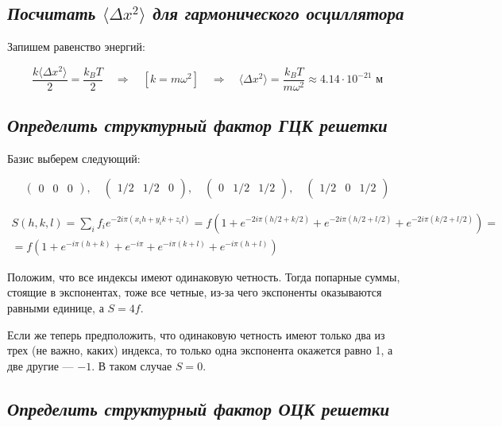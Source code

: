 \documentclass[a4paper, 12pt]{article}
\newcommand{\qrq}
{\ensuremath{\quad \Rightarrow \quad}} %
\begin{document}
\subsection{\textit{Посчитать $\langle \Delta x^2 \rangle$ для гармонического осциллятора}}

Запишем равенство энергий:

\begin{equation}
	\frac{k \langle \Delta x^2 \rangle}{2} = \frac{k_B T}{2} \qrq \left[k = m \omega^2\right] \qrq \langle \Delta x^2 \rangle = \frac{k_B T}{m \omega^2} \approx 4.14 \cdot 10^{-21} \text{ м}
\end{equation}

\subsection{\textit{Определить структурный фактор ГЦК решетки}}

Базис выберем следующий:

\begin{equation}
\begin{pmatrix}
	0 & 0 & 0
\end{pmatrix}, \quad
\begin{pmatrix}
	1/2 & 1/2  & 0
\end{pmatrix}, \quad
\begin{pmatrix}
	0 & 1/2 & 1/2
\end{pmatrix}, \quad
\begin{pmatrix}
	1/2 & 0 & 1/2 
\end{pmatrix}
\end{equation}

\begin{align*}
	S(h, k, l) = \sum\limits_i f_i e^{-2 i \pi (x_i h + y_i k + z_i l)} = f\left(1 + e^{-2 i \pi (h/2 + k/2)} + e^{-2i\pi(h/2 + l/2)} + e^{-2i\pi(k/2 + l/2)}\right) = \\
	= f(1 + e^{-i\pi(h + k)} + e^{-i\pi} + e^{-i\pi(k + l)} + e^{-i\pi(h + l)})
\end{align*}

Положим, что все индексы имеют одинаковую четность. Тогда попарные суммы, стоящие в экспонентах, тоже все четные, из-за чего экспоненты оказываются равными единице, а $S = 4f$.

Если же теперь предположить, что одинаковую четность имеют только два из трех (не важно, каких) индекса, то только одна экспонента окажется равно 1, а две другие --- $-1$. В таком случае $S = 0$.

\subsection{\textit{Определить структурный фактор ОЦК решетки}} 
\end{document}
